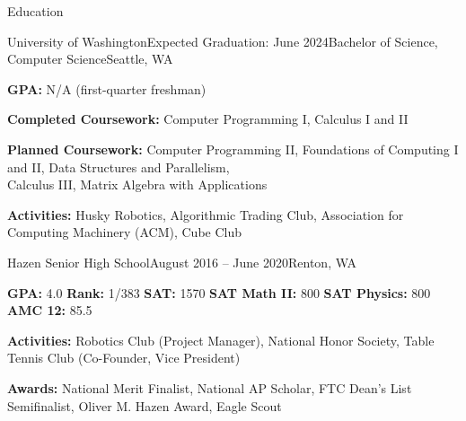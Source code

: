 \documentclass{resume} %
\begin{document}
\vspace{-1.0em} %


\begin{rSection}{Education}

\begin{education}{University of Washington}{Expected Graduation: June 2024}{Bachelor of Science, Computer Science}{Seattle, WA}
\item {\bf GPA:} N/A (first-quarter freshman)
\item {\bf Completed Coursework:} Computer Programming I, Calculus I and II
\item {\bf Planned Coursework:} Computer Programming II, Foundations of Computing I and II, Data Structures and Parallelism,  \\ Calculus III, Matrix Algebra with Applications
\item {\bf Activities:} Husky Robotics, Algorithmic Trading Club, Association for Computing Machinery (ACM), Cube Club
\end{education}

\begin{education}{Hazen Senior High School}{August 2016 – June 2020}{}{Renton, WA}
\item {\bf GPA:} 4.0 \hspace{5mm} {\bf Rank:} 1/383 \hspace{5mm} {\bf SAT:} 1570 \hspace{5mm} {\bf SAT Math II:} 800 \hspace{5mm} {\bf SAT Physics:} 800 \hspace{5mm} {\bf AMC 12:} 85.5
\item {\bf Activities:} Robotics Club (Project Manager), National Honor Society, Table Tennis Club (Co-Founder, Vice President)
\item {\bf Awards:} National Merit Finalist, National AP Scholar, FTC Dean's List Semifinalist, Oliver M. Hazen Award, Eagle Scout
\end{education}

\end{rSection}

\end{document}
